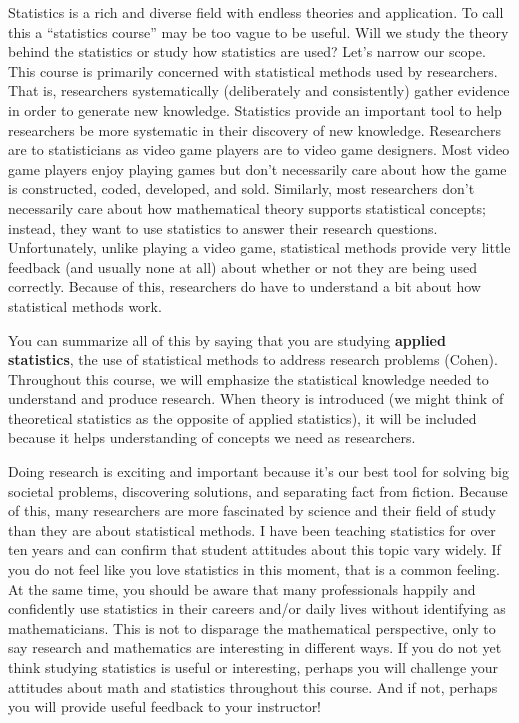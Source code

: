 \documentclass[
]{book}
\begin{document}
Statistics is a rich and diverse field with endless theories and application. To call this a ``statistics course'' may be too vague to be useful. Will we study the theory behind the statistics or study how statistics are used? Let's narrow our scope. This course is primarily concerned with statistical methods used by researchers. That is, researchers systematically (deliberately and consistently) gather evidence in order to generate new knowledge. Statistics provide an important tool to help researchers be more systematic in their discovery of new knowledge. Researchers are to statisticians as video game players are to video game designers. Most video game players enjoy playing games but don't necessarily care about how the game is constructed, coded, developed, and sold. Similarly, most researchers don't necessarily care about how mathematical theory supports statistical concepts; instead, they want to use statistics to answer their research questions. Unfortunately, unlike playing a video game, statistical methods provide very little feedback (and usually none at all) about whether or not they are being used correctly. Because of this, researchers do have to understand a bit about how statistical methods work.

You can summarize all of this by saying that you are studying \textbf{applied statistics}, the use of statistical methods to address research problems (Cohen). Throughout this course, we will emphasize the statistical knowledge needed to understand and produce research. When theory is introduced (we might think of theoretical statistics as the opposite of applied statistics), it will be included because it helps understanding of concepts we need as researchers.

Doing research is exciting and important because it's our best tool for solving big societal problems, discovering solutions, and separating fact from fiction. Because of this, many researchers are more fascinated by science and their field of study than they are about statistical methods. I have been teaching statistics for over ten years and can confirm that student attitudes about this topic vary widely. If you do not feel like you love statistics in this moment, that is a common feeling. At the same time, you should be aware that many professionals happily and confidently use statistics in their careers and/or daily lives without identifying as mathematicians. This is not to disparage the mathematical perspective, only to say research and mathematics are interesting in different ways. If you do not yet think studying statistics is useful or interesting, perhaps you will challenge your attitudes about math and statistics throughout this course. And if not, perhaps you will provide useful feedback to your instructor!
\end{document}
